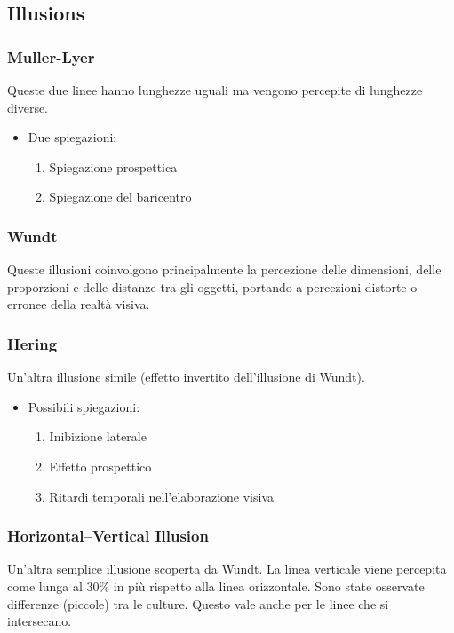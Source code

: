   \subsection{Illusions}
  \subsubsection{Muller-Lyer}
  Queste due linee hanno lunghezze uguali ma vengono percepite di lunghezze diverse.
    \begin{itemize}
        \item Due spiegazioni:
        \begin{enumerate}
            \item Spiegazione prospettica
            \item Spiegazione del baricentro
        \end{enumerate}
    \end{itemize}
  \subsubsection{Wundt}
  Queste illusioni coinvolgono principalmente la percezione delle dimensioni, delle proporzioni e delle distanze tra gli oggetti, portando
   a percezioni distorte o erronee della realtà visiva.
  \subsubsection{Hering}
  Un'altra illusione simile (effetto invertito dell'illusione di Wundt).
\begin{itemize}
    \item Possibili spiegazioni:
    \begin{enumerate}
        \item Inibizione laterale
        \item Effetto prospettico
        \item Ritardi temporali nell'elaborazione visiva
    \end{enumerate}
\end{itemize}

  \subsubsection{Horizontal–Vertical Illusion}
  Un'altra semplice illusione scoperta da Wundt.
  La linea verticale viene percepita come lunga al 30\% in più rispetto alla linea orizzontale.
  Sono state osservate differenze (piccole) tra le culture.
  Questo vale anche per le linee che si intersecano.
